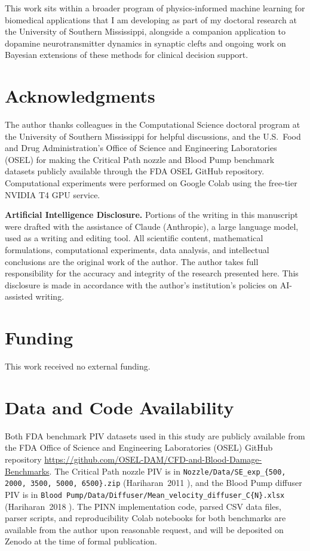 \documentclass[12pt,a4paper]{article}
\begin{document}
This work sits within a broader program of physics-informed
machine learning for biomedical applications that I am
developing as part of my doctoral research at the University of
Southern Mississippi, alongside a companion application to
dopamine neurotransmitter dynamics in synaptic clefts
\cite{HackmanB3_2025} and ongoing work on Bayesian extensions
of these methods for clinical decision support.

\section*{Acknowledgments}

The author thanks colleagues in the Computational Science
doctoral program at the University of Southern Mississippi for
helpful discussions, and the U.S.\ Food and Drug
Administration's Office of Science and Engineering Laboratories
(OSEL) for making the Critical Path nozzle and Blood Pump
benchmark datasets publicly available through the FDA OSEL
GitHub repository. Computational experiments were performed on
Google Colab using the free-tier NVIDIA T4 GPU service.

\medskip
\noindent\textbf{Artificial Intelligence Disclosure.}
Portions of the writing in this manuscript were drafted with the
assistance of Claude (Anthropic), a large language model, used as
a writing and editing tool. All scientific content, mathematical
formulations, computational experiments, data analysis, and
intellectual conclusions are the original work of the author.
The author takes full responsibility for the accuracy and integrity
of the research presented here. This disclosure is made in
accordance with the author's institution's policies on AI-assisted
writing.

\section*{Funding}

This work received no external funding.

\section*{Data and Code Availability}

Both FDA benchmark PIV datasets used in this study are
publicly available from the FDA Office of Science and
Engineering Laboratories (OSEL) GitHub repository
\url{https://github.com/OSEL-DAM/CFD-and-Blood-Damage-Benchmarks}.
The Critical Path nozzle PIV is in
\texttt{Nozzle/Data/SE\_exp\_\{500, 2000, 3500, 5000, 6500\}.zip}
(Hariharan~2011 \cite{Hariharan2011FDA}), and the Blood Pump
diffuser PIV is in
\texttt{Blood\ Pump/Data/Diffuser/Mean\_velocity\_diffuser\_C\{N\}.xlsx}
(Hariharan~2018 \cite{Hariharan2018BloodPump}). The PINN
implementation code, parsed CSV data files, parser scripts, and
reproducibility Colab notebooks for both benchmarks are
available from the author upon reasonable request, and will be
deposited on Zenodo at the time of formal publication.
\end{document}
